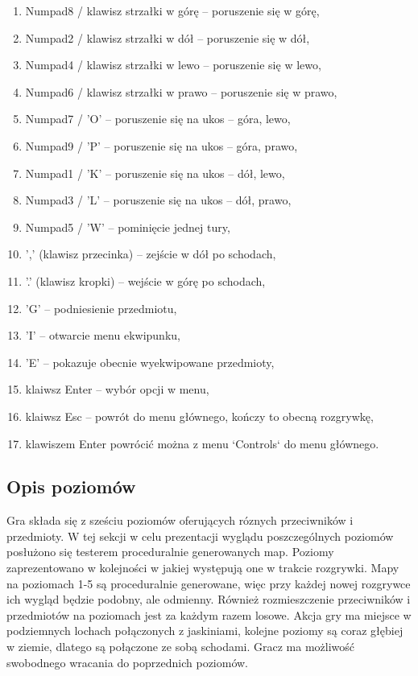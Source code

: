 \documentclass[12pt,twoside]{article}
\begin{document}
\begin{enumerate}
	\item Numpad8 / klawisz strzałki w górę -- poruszenie się w górę,
	\item Numpad2 / klawisz strzałki w dół -- poruszenie się w dół,
	\item Numpad4 / klawisz strzałki w lewo -- poruszenie się w lewo,
	\item Numpad6 / klawisz strzałki w prawo -- poruszenie się w prawo,
	\item Numpad7 / 'O' -- poruszenie się na ukos -- góra, lewo,
	\item Numpad9 / 'P' -- poruszenie się na ukos -- góra, prawo,
	\item Numpad1 / 'K' -- poruszenie się na ukos -- dół, lewo,
	\item Numpad3 / 'L' -- poruszenie się na ukos -- dół, prawo,
	\item Numpad5 / 'W' -- pominięcie jednej tury,
	\item ',' (klawisz przecinka) -- zejście w dół po schodach,
	\item '.' (klawisz kropki) -- wejście w górę po schodach,
	\item 'G' -- podniesienie przedmiotu,
	\item 'I' -- otwarcie menu ekwipunku,
	\item 'E' -- pokazuje obecnie wyekwipowane przedmioty,
	\item klaiwsz Enter -- wybór opcji w menu,
	\item klaiwsz Esc -- powrót do menu głównego, kończy to obecną rozgrywkę,
	\item klawiszem Enter powrócić można z menu `Controls` do menu głównego.
\end{enumerate}


\subsection{Opis poziomów}
Gra składa się z sześciu poziomów oferujących róznych przeciwników i przedmioty. W tej sekcji w celu prezentacji wyglądu poszczególnych poziomów posłużono się testerem proceduralnie generowanych map. Poziomy zaprezentowano w kolejności w jakiej występują one w trakcie rozgrywki. Mapy na poziomach 1-5 są proceduralnie generowane, więc przy każdej nowej rozgrywce ich wygląd będzie podobny, ale odmienny. Również rozmieszczenie przeciwników i przedmiotów na poziomach jest za każdym razem losowe. Akcja gry ma miejsce w podziemnych lochach połączonych z jaskiniami, kolejne poziomy są coraz głębiej w ziemie, dlatego są połączone ze sobą schodami. Gracz ma możliwość swobodnego wracania do poprzednich poziomów.
\end{document}
